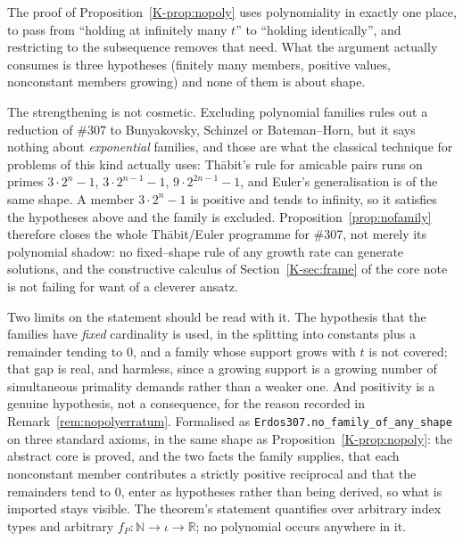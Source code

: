 \documentclass[11pt]{article}
\theoremstyle{definition}
\begin{document}
The proof of Proposition~\ref{K-prop:nopoly} uses polynomiality in exactly one place, to pass from
``holding at infinitely many $t$'' to ``holding identically'', and restricting to the subsequence
removes that need. What the argument actually consumes is three hypotheses (finitely many members,
positive values, nonconstant members growing) and none of them is about shape.

The strengthening is not cosmetic. Excluding polynomial families rules out a reduction of \#307 to
Bunyakovsky, Schinzel or Bateman--Horn, but it says nothing about \emph{exponential} families, and
those are what the classical technique for problems of this kind actually uses: Th\=abit's rule for
amicable pairs runs on primes $3\cdot2^{n}-1$, $3\cdot2^{n-1}-1$, $9\cdot2^{2n-1}-1$, and Euler's
generalisation is of the same shape. A member $3\cdot2^{n}-1$ is positive and tends to infinity, so
it satisfies the hypotheses above and the family is excluded. Proposition~\ref{prop:nofamily}
therefore closes the whole Th\=abit/Euler programme for \#307, not merely its polynomial shadow: no
fixed--shape rule of any growth rate can generate solutions, and the constructive calculus of
Section~\ref{K-sec:frame} of the core note is not failing for want of a cleverer ansatz.

Two limits on the statement should be read with it. The hypothesis that the families have
\emph{fixed} cardinality is used, in the splitting into constants plus a remainder tending to $0$, and
a family whose support grows with $t$ is not covered; that gap is real, and harmless, since a growing
support is a growing number of simultaneous primality demands rather than a weaker one. And
positivity is a genuine hypothesis, not a consequence, for the reason recorded in
Remark~\ref{rem:nopolyerratum}. Formalised as \texttt{Erdos307.no\_family\_of\_any\_shape} on three
standard axioms, in the same shape as Proposition~\ref{K-prop:nopoly}: the abstract core is proved, and
the two facts the family supplies, that each nonconstant member contributes a strictly positive
reciprocal and that the remainders tend to $0$, enter as hypotheses rather than being derived, so
what is imported stays visible. The theorem's statement quantifies over arbitrary index types and
arbitrary $f_P:\mathbb{N}\to\iota\to\mathbb{R}$; no polynomial occurs anywhere in it.
\end{document}
